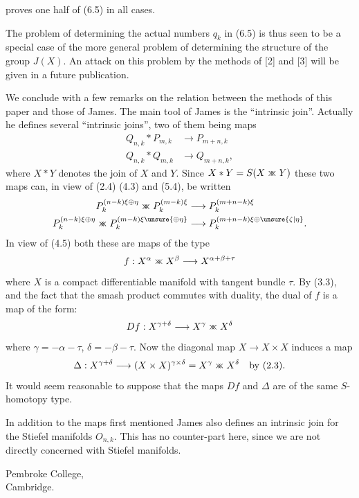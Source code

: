 proves one half of (6.5) in all cases.

The problem of determining the actual numbers $q_k$ in (6.5) is thus
seen to be a special case of the more general problem of determining
the structure of the group $J(X)$. An attack on this problem by the
methods of [2] and [3] will be given in a future publication.

We conclude with a few remarks on the relation between the methods of
this paper and those of James. The main tool of James is the ``intrinsic
join''. Actually he defines several ``intrinsic joins'', two of them
being maps
\[
\begin{aligned}
Q_{n,k}*P_{m,k}&\longrightarrow P_{m+n,k}\\
Q_{n,k}*Q_{m,k}&\longrightarrow Q_{m+n,k},
\end{aligned}
\]
where $X*Y$ denotes the join of $X$ and $Y$. Since
$X*Y=S(X\mathbin{\times\mkern-10mu\times}Y)$\inserted{${}^+$}
these two maps can, in view of (2.4) (4.3) and (5.4), be written
\[
\begin{aligned}
P_k^{(n-k)\xi\oplus\eta}\mathbin{\times\mkern-10mu\times}
P_k^{(m-k)\xi}&\longrightarrow P_k^{(m+n-k)\xi}\\
P_k^{(n-k)\xi\oplus\eta}\mathbin{\times\mkern-10mu\times}
P_k^{(m-k)\xi\unsure{\oplus\eta}}&\longrightarrow
P_k^{(m+n-k)\xi\oplus\unsure{\zeta|\eta}}.
\end{aligned}
\]
In view of (4.5) both these are maps of the type
\[
f:X^\alpha\mathbin{\times\mkern-10mu\times}X^\beta
\longrightarrow X^{\alpha+\beta+\tau}
\]
where $X$ is a compact differentiable manifold with tangent bundle
$\tau$. By (3.3), and the fact that the smash product commutes with
duality, the dual of $f$ is a map of the form:
\[
Df:X^{\gamma+\delta}\longrightarrow
X^\gamma\mathbin{\times\mkern-10mu\times}X^\delta
\]
where $\gamma=-\alpha-\tau$, $\delta=-\beta-\tau$. Now the diagonal map
$X\longrightarrow X\times X$ induces a map
\[
\Delta:X^{\gamma+\delta}\longrightarrow(X\times X)^{\gamma\times\delta}
=X^\gamma\mathbin{\times\mkern-10mu\times}X^\delta
\quad\text{by (2.3).}
\]
It would seem reasonable to suppose that the maps $Df$ and $\Delta$ are
of the same $S$-homotopy type.

In addition to the maps first mentioned James also defines an intrinsic
join for the Stiefel manifolds $O_{n,k}$. This has no counter-part here,
since we are not directly concerned with Stiefel manifolds.

Pembroke College,\\
Cambridge.

